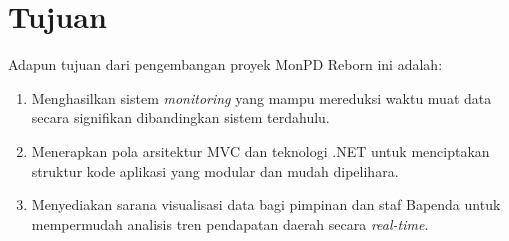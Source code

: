 \section{Tujuan}
\label{sec:tujuan}

Adapun tujuan dari pengembangan proyek MonPD Reborn ini adalah:
\begin{enumerate}
    \item Menghasilkan sistem \emph{monitoring} yang mampu mereduksi waktu muat data secara signifikan dibandingkan sistem terdahulu.
    \item Menerapkan pola arsitektur MVC dan teknologi .NET untuk menciptakan struktur kode aplikasi yang modular dan mudah dipelihara.
    \item Menyediakan sarana visualisasi data bagi pimpinan dan staf Bapenda untuk mempermudah analisis tren pendapatan daerah secara \emph{real-time}.
\end{enumerate}
